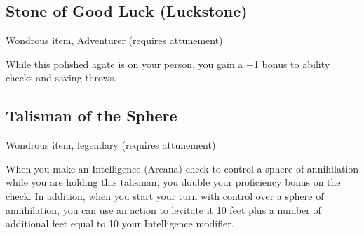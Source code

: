 \subsection{Stone of Good Luck (Luckstone)}
Wondrous item, Adventurer (requires attunement) 

While this polished agate is on your person, you gain a +1 bonus to ability checks and saving throws.

\subsection{Talisman of the Sphere}
Wondrous item, legendary (requires attunement) 

When you make an Intelligence (Arcana) check to control a sphere of annihilation while you are holding this talisman, you double your proficiency bonus on the check. In addition, when you start your turn with control over a sphere of annihilation, you can use an action to levitate it 10 feet plus a number of additional feet equal to 10 \texttimes your Intelligence modifier.